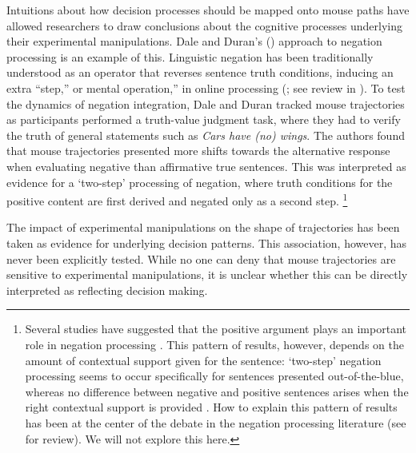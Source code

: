 \documentclass{article}
\begin{document}
Intuitions about how decision processes should be mapped onto mouse paths have allowed researchers to draw conclusions about the cognitive processes underlying their experimental manipulations. Dale and Duran's (\citeyear{Dale2011}) approach to negation processing is an example of this.   
Linguistic negation has been traditionally understood as an operator that reverses sentence truth conditions, inducing an extra ``step,'' or mental operation,'' in online processing (\citealp{wason1965contexts,wason1972psychology}; see review in \citealp{Tian2016}). %
To test the dynamics of negation integration, Dale and Duran tracked mouse trajectories as participants performed a truth-value judgment task, where they had to verify the truth of general statements such as \textit{Cars have (no) wings}.
%
The authors found that mouse trajectories presented more shifts towards the alternative response when evaluating negative than affirmative true sentences. This was interpreted as evidence for a `two-step' processing of negation, where truth conditions for the positive content are first derived and negated only as a second step.%
%
\footnote{Several studies have suggested that the positive argument plays an important role in negation processing \citep[among others]{kaup2007experiential,ludtke2008event}.  
This pattern of results, however, depends on the amount of contextual support given for the sentence: `two-step' negation processing seems to occur specifically for sentences presented out-of-the-blue, whereas no difference between negative and positive sentences arises when the right contextual support is provided \citep{nieuwland2008truth,tian2010we}. How to explain this pattern of results has been at the center of the debate in the negation processing literature (see \citealp{Tian2016} for review). We will not explore this here.}

The impact of experimental manipulations on the shape of trajectories has been taken as evidence for underlying decision patterns. This association, however, has never been explicitly tested. While no one can deny that mouse trajectories are sensitive to experimental manipulations, it is unclear whether this can be directly interpreted as reflecting decision making. 
\end{document}
